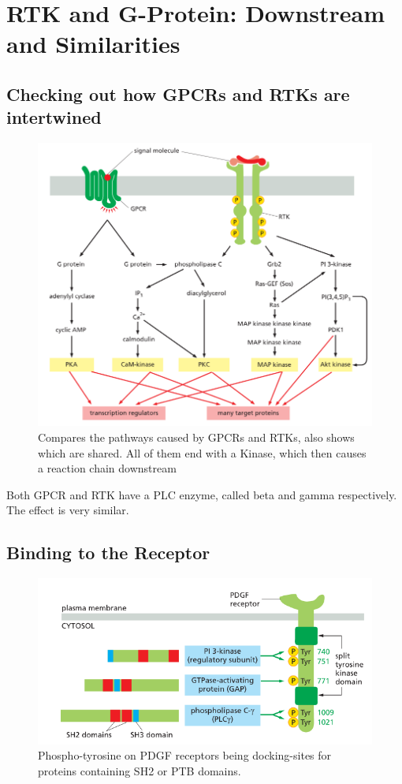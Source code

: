 \documentclass[../main.tex]{subfiles}
\begin{document}
\section{RTK and G-Protein: Downstream and Similarities}


\subsection{Checking out how GPCRs and RTKs are intertwined}
\begin{figure}[H]
	\centering
	\includegraphics[width=0.5\linewidth]{GPCR_RTK}
	\caption{Compares the pathways caused by GPCRs and RTKs, also shows which are shared. All of them end with a Kinase, which then causes a reaction chain downstream}
\end{figure}

Both GPCR and RTK have a \gls{PLC} enzyme, called beta and gamma respectively. The effect is very similar.

\subsection{Binding to the Receptor}

\begin{figure}[H]
	\centering
	\includegraphics[width=0.7\linewidth]{pdgf}
	\caption{Phospho-tyrosine on PDGF receptors being docking-sites for proteins containing SH2 or PTB domains.}
	\label{fig:pdgf}
\end{figure}
\end{document}

